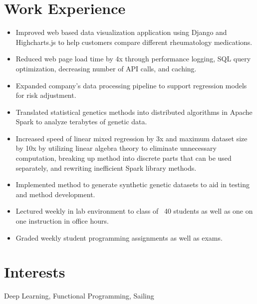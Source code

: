 \documentclass[12pt]{john_resume}
\begin{document}
\section{Work Experience}
\begin{itemize}
	\itemsep0em 
	\item Improved web based data visualization application using Django and Highcharts.js to help customers compare different rheumatology medications.
	\item Reduced web page load time by 4x through performance logging, SQL query optimization, decreasing number of API calls, and caching.
	\item Expanded company's data processing pipeline to support regression models for risk adjustment.
\end{itemize}
\begin{itemize}
	\itemsep0em 
	\item Translated statistical genetics methods into distributed algorithms in Apache Spark to analyze 
		terabytes of genetic data.
	\item Increased speed of linear mixed regression by 3x and maximum dataset size by 10x by utilizing 
		linear algebra theory to eliminate unnecessary computation, breaking up method into discrete parts 	
		that can be used separately, and rewriting inefficient Spark library methods. 
	\item Implemented method to generate synthetic genetic datasets to aid in testing and method 
		development.
\end{itemize}
\begin{itemize}
	\itemsep0em 
	\item Lectured weekly in lab environment to class of ~40 students as well as one on one instruction in office hours. 
	\item Graded weekly student programming assignments as well as exams.
\end{itemize}


\section{Interests}
Deep Learning, Functional Programming, Sailing
\end{document}
